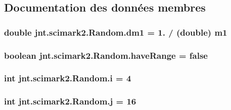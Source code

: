 \subsection{Documentation des données membres}
\hypertarget{classjnt_1_1scimark2_1_1Random_ad3888251b40ce8ae37a68b5b2e2bd0c5}{
\subsubsection[{dm1}]{\setlength{\rightskip}{0pt plus 5cm}double jnt.\-scimark2.\-Random.\-dm1 = 1. / (double) {\bf m1}\hspace{0.3cm}{\ttfamily [private]}}}\label{classjnt_1_1scimark2_1_1Random_ad3888251b40ce8ae37a68b5b2e2bd0c5}
\hypertarget{classjnt_1_1scimark2_1_1Random_a528187285b1330b8a017e2064118e868}{
\subsubsection[{have\-Range}]{\setlength{\rightskip}{0pt plus 5cm}boolean jnt.\-scimark2.\-Random.\-have\-Range = false\hspace{0.3cm}{\ttfamily [private]}}}\label{classjnt_1_1scimark2_1_1Random_a528187285b1330b8a017e2064118e868}
\hypertarget{classjnt_1_1scimark2_1_1Random_a044347a46cf3161801a3739a2f249e66}{
\subsubsection[{i}]{\setlength{\rightskip}{0pt plus 5cm}int jnt.\-scimark2.\-Random.\-i = 4\hspace{0.3cm}{\ttfamily [private]}}}\label{classjnt_1_1scimark2_1_1Random_a044347a46cf3161801a3739a2f249e66}
\hypertarget{classjnt_1_1scimark2_1_1Random_a7d323c56dc4af7c9914e08175665cbcb}{
\subsubsection[{j}]{\setlength{\rightskip}{0pt plus 5cm}int jnt.\-scimark2.\-Random.\-j = 16\hspace{0.3cm}{\ttfamily [private]}}}\label{classjnt_1_1scimark2_1_1Random_a7d323c56dc4af7c9914e08175665cbcb}
